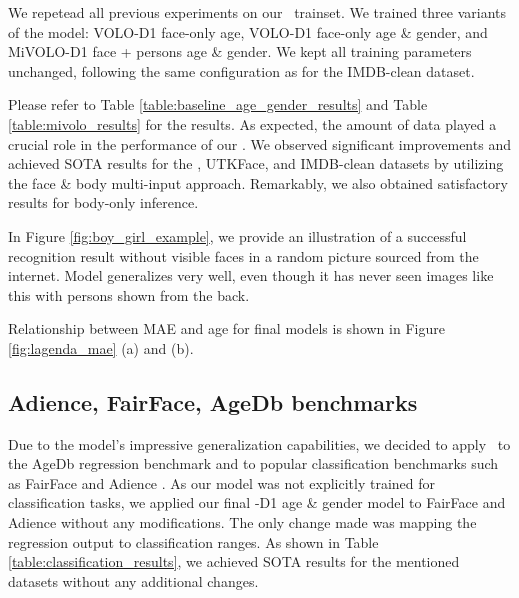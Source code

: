 We repetead all previous experiments on our \DatasetNameShort\ trainset. We trained three variants of the model: VOLO-D1 face-only age, VOLO-D1 face-only age \& gender, and MiVOLO-D1 face + persons age \& gender. We kept all training parameters unchanged, following the same configuration as for the IMDB-clean dataset.

Please refer to Table \ref{table:baseline_age_gender_results} and Table \ref{table:mivolo_results} for the results. As expected, the amount of data played a crucial role in the performance of our \ModelName. We observed significant improvements and achieved SOTA results for the \DatasetNameShort, UTKFace, and IMDB-clean datasets by utilizing the face \& body multi-input approach. Remarkably, we also obtained satisfactory results for body-only inference. 

In Figure \ref{fig:boy_girl_example}, we provide an illustration of a successful recognition result without visible faces in a random picture sourced from the internet.
Model generalizes very well, even though it has never seen images like this with persons shown from the back.

Relationship between MAE and age for final models is shown in Figure \ref{fig:lagenda_mae} (a) and (b).

\subsection{Adience, FairFace, AgeDb benchmarks}

Due to the model's impressive generalization capabilities, we decided to apply \ModelName \ to the AgeDb \cite{moschoglou2017agedb} regression benchmark and to popular classification benchmarks such as FairFace \cite{fairface} and Adience \cite{adience}. As our model was not explicitly trained for classification tasks, we applied our final \ModelName-D1 age \& gender model to FairFace and Adience without any modifications. The only change made was mapping the regression output to classification ranges. As shown in Table \ref{table:classification_results}, we achieved SOTA results for the mentioned datasets without any additional changes.

